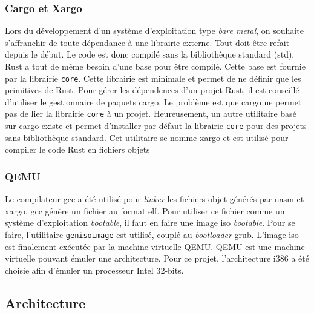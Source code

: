 \subsubsection{Cargo et Xargo}
Lors du développement d'un système d'exploitation type \textit{bare metal}, on souhaite
s'affranchir de toute dépendance à une librairie externe. Tout doit être refait depuis
le début. Le code est donc compilé sans la bibliothèque standard (std). Rust a tout
de même besoin d'une base pour être compilé. Cette base est fournie par la librairie
\texttt{core}. Cette librairie est minimale et permet de ne définir que
les primitives de Rust. Pour gérer les dépendences d'un projet Rust, il est conseillé
d'utiliser le gestionnaire de paquets cargo. Le problème est que cargo ne permet
pas de lier la librairie \texttt{core} à un projet. Heureusement, un 
autre utilitaire basé sur cargo existe et permet d'installer par défaut la librairie
\texttt{core} pour des projets sans bibliothèque standard. Cet utilitaire
se nomme xargo et est utilisé pour compiler le code Rust en fichiers objets \\

\subsubsection{QEMU}
Le compilateur \acrshort{gcc} a été utilisé pour \textit{linker} les fichiers
objet générés par nasm et xargo. \acrshort{gcc} génère un fichier au format \acrshort{elf}.
Pour utiliser ce fichier comme un système d'exploitation \textit{bootable}, il faut
en faire une image \acrshort{iso} \textit{bootable}. Pour se faire, l'utilitaire
\texttt{genisoimage} est utilisé, couplé au \textit{bootloader} \acrshort{grub}.
L'image \acrshort{iso} est finalement exécutée par la machine virtuelle QEMU.
QEMU est une machine virtuelle pouvant émuler une architecture. Pour ce projet,
l'architecture i386 a été choisie afin d'émuler un processeur Intel 32-bits.


\subsection{Architecture}